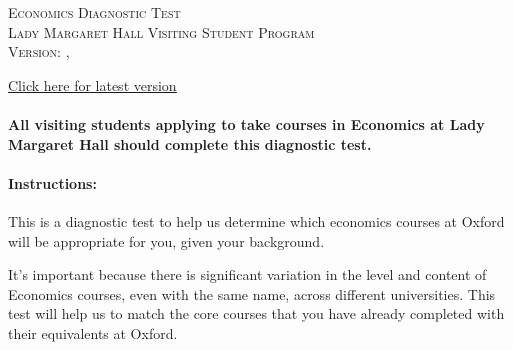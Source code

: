 \documentclass[addpoints,12pt,a4paper]{exam}
\begin{document}
\begin{center}

  \textsc{\Large Economics Diagnostic Test \\ \medskip \normalsize Lady Margaret Hall Visiting Student Program \\ \vspace{0.5em} Version: \DTMtoday, \DTMcurrenttime}

  \vspace{1em}

  \href{https://raw.githubusercontent.com/fditraglia/lmh-econ-diagnostic/main/lmh-econ-diagnostic.pdf}{\underline{Click here for latest version}}

\vspace{2em}


\end{center}

\vspace{1em}

\paragraph{All visiting students applying to take courses in Economics at Lady Margaret Hall should complete this diagnostic test.}


\paragraph{Instructions:} This is a diagnostic test to help us determine which economics courses at Oxford will be appropriate for you, given your background. 

It's important because there is significant variation in the level and content of Economics courses, even with the same name, across different universities.  This test will help us to match the core courses that you have already completed with their equivalents at Oxford.

\end{document}
